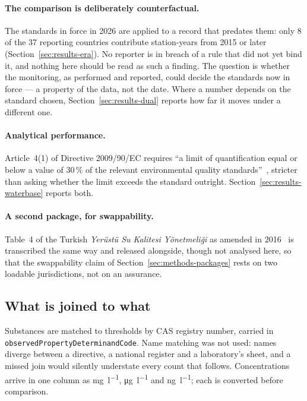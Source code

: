 \paragraph{The comparison is deliberately counterfactual.}
The standards in force in \num{2026} are applied to a record that predates them:
only \num{8} of the \num{37} reporting countries contribute station-years from
\num{2015} or later (Section~\ref{sec:results-era}). No reporter is in breach of
a rule that did not yet bind it, and nothing here should be read as such a
finding. The question is whether the monitoring, as performed and reported,
could decide the standards now in force --- a property of the data, not the
date. Where a number depends on the standard chosen,
Section~\ref{sec:results-dual} reports how far it moves under a different one.

\paragraph{Analytical performance.}
Article~4(1) of Directive 2009/90/EC requires ``a limit of quantification equal
or below a value of \num{30}\,\% of the relevant environmental quality
standards''~\cite{eu2009qaqc}, stricter than asking whether the limit exceeds
the standard outright. Section~\ref{sec:results-waterbase} reports both.

\paragraph{A second package, for swappability.}
Table~4 of the Turkish \emph{Yer\"ust\"u Su Kalitesi Y\"onetmeli\u{g}i} as
amended in \num{2016}~\cite{tr2012ysky} is transcribed the same
way and released alongside, though not
analysed here, so that the swappability claim of
Section~\ref{sec:methods-packages} rests on two loadable jurisdictions, not on
an assurance.

\subsection{What is joined to what}
Substances are matched to thresholds by CAS registry number, carried in
\texttt{observedPropertyDeterminandCode}. Name matching was not used: names
diverge between a directive, a national register and a laboratory's sheet, and a
missed join would silently understate every count that follows. Concentrations
arrive in one column as \si{\milli\gram\per\litre}, \si{\micro\gram\per\litre}
and \si{\nano\gram\per\litre}; each is converted before comparison.
